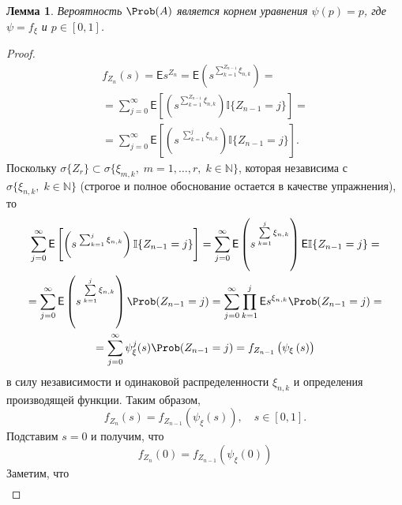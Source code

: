 \documentclass[a4paper]{article}
\newcommand{\Expect}{\mathsf{E}}
\newcommand{\ind}{\mathbb I}
\theoremstyle{plain}
\newtheorem{lem}[thm]{Лемма}
\theoremstyle{definition}
\theoremstyle{remark}
\begin{document}
\begin{lem}
  \label{lem1}
  Вероятность $\Prob(A)$ является корнем уравнения $\psi(p) = p$, где $\psi = f_{\xi}$ и $p \in [0, 1]$.
\end{lem}

\begin{proof}

  \begin{multline*}
    f_{Z_{n}}(s) = \Expect s^{Z_{n}} = \Expect \left(s^{\sum_{k=1}^{Z_{n-1}} \xi_{n, k}}\right) =\\
    = \sum_{j=0}^{\infty} \Expect \left[ \left( s^{\sum_{k=1}^{Z_{n-1}} \xi_{n, k}} \right)  \ind \lbrace Z_{n-1} = j \rbrace \right] = \\ = \sum_{j=0}^{\infty} \Expect \left[ \left( s \: ^{\sum_{k=1}^{j} \xi_{n, k}} \right)  \ind \lbrace Z_{n-1} = j \rbrace \right].
  \end{multline*}
  Поскольку $\sigma \lbrace Z_{r} \rbrace \subset \sigma \lbrace \xi_{m, k}, \; m = 1, \ldots, r, \; k \in \mathbb{N} \rbrace$, которая независима с $\sigma \lbrace \xi_{n, k}, \; k \in \mathbb{N} \rbrace$ (строгое и полное обоснование остается в качестве упражнения), то
  \begin{multline*}
    \sum_{j=0}^{\infty} \Expect \left[ \left( s \: ^{\sum_{k=1}^{j} \xi_{n, k}} \right)  \ind \lbrace Z_{n-1} = j \rbrace \right]  =  \sum\limits_{j=0}^{\infty} \Expect \left(s \: ^{\sum\limits_{k=1}^{j} \xi_{n, k}}\right) \Expect \ind \lbrace Z_{n-1} = j \rbrace  = \\ = \sum\limits_{j=0}^{\infty} \Expect \left(s \: ^{\sum\limits_{k=1}^{j} \xi_{n, k}}\right) \Prob ( Z_{n-1} = j ) = \sum\limits_{j=0}^{\infty} \prod\limits_{k=1}^{j} \Expect s^{\xi_{n, k}} \Prob (Z_{n-1} = j) = \\ = \sum\limits_{j=0}^{\infty} \psi_{\xi}^{j} (s) \Prob (Z_{n-1} = j)  =  f_{Z_{n-1}} \left(\psi_{\xi} \left(s \right) \right)
  \end{multline*}
  в силу независимости и одинаковой распределенности $\xi_{n, k}$ и определения производящей функции. Таким образом,
  \begin{equation*}
    f_{Z_{n}} (s) = f_{Z_{n-1}} \left( \psi_{\xi} \left(s \right)\right){,}\quad s \in [0, 1]{.}
  \end{equation*}
  Подставим $s = 0$ и получим, что
  \begin{equation*}
    f_{Z_{n}} (0) = f_{Z_{n-1}} \left( \psi_{\xi} \left(0 \right)\right)
  \end{equation*}
  Заметим, что
  \begin{multline*}

\end{multline*}
\end{proof}
\end{document}
